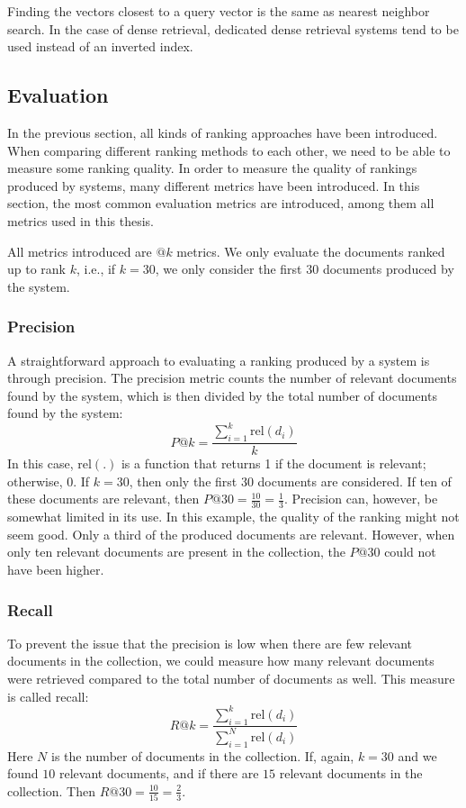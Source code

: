 Finding the vectors closest to a query vector is the same as nearest neighbor search. In the case of dense retrieval, dedicated dense retrieval systems tend to be used instead of an inverted index. 

\subsection{Evaluation}
\label{sec:evaluation}
In the previous section, all kinds of ranking approaches have been introduced. When comparing different ranking methods to each other, we need to be able to measure some ranking quality. In order to measure the quality of rankings produced by systems, many different metrics have been introduced. In this section, the most common evaluation metrics are introduced, among them all metrics used in this thesis. 

All metrics introduced are $@k$ metrics. We only evaluate the documents ranked up to rank $k$, i.e., if $k=30$, we only consider the first $30$ documents produced by the system.

\subsubsection{Precision}
A straightforward approach to evaluating a ranking produced by a system is through precision. The precision metric counts the number of relevant documents found by the system, which is then divided by the total number of documents found by the system:
\begin{equation}
	\textit{P}@k = \frac{\sum_{i=1}^k\text{rel}\left(d_i\right)}{k}
\end{equation}
In this case, $\text{rel}(.)$ is a function that returns 1 if the document is relevant; otherwise, 0.
If $k=30$, then only the first $30$ documents are considered. If ten of these documents are relevant, then $P@30 = \frac{10}{30} = \frac{1}{3}$. Precision can, however, be somewhat limited in its use. In this example, the quality of the ranking might not seem good. Only a third of the produced documents are relevant. However, when only ten relevant documents are present in the collection, the $P@30$ could not have been higher. 

\subsubsection{Recall}
To prevent the issue that the precision is low when there are few relevant documents in the collection, we could measure how many relevant documents were retrieved compared to the total number of documents as well. This measure is called recall: 
\begin{equation}
	\textit{R}@k = \frac{\sum_{i=1}^k\text{rel}\left(d_i\right)}{\sum_{i=1}^N\text{rel}\left(d_i\right)}
\end{equation}
Here $N$ is the number of documents in the collection. If, again, $k=30$ and we found $10$ relevant documents, and if there are $15$ relevant documents in the collection. Then $R@30 = \frac{10}{15} = \frac{2}{3}$.

